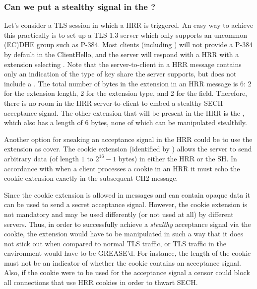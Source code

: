 \subsubsection{Can we put a stealthy signal in the ?}

Let's consider a \ac{TLS} session in which a \ac{HRR} is triggered.
An easy way to achieve this practically is to set up a TLS 1.3 server which only supports an uncommon (\ac{EC})\ac{DHE} group such as P-384.
Most clients (including ) will not provide a P-384  by default in the ClientHello,
and the server will respond with a \ac{HRR} with a  extension selecting .
Note that the server-to-client 
in a \ac{HRR} message contains only an indication of the type of key share the server supports,
but does not include a .
The total number of bytes in the  extension in an \ac{HRR} message is 6: 2 for the extension length, 2 for the extension type, and 2 for the  field. Therefore, there is no room in the HRR server-to-client  to embed a stealthy \ac{SECH} acceptance signal.
The other extension that will be present in the \ac{HRR} is the , which also has a length of 6 bytes, none of which can be manipulated stealthily.

Another option for sneaking an acceptance signal in the \ac{HRR}
could be to use the  extension as cover.
The cookie extension (identified by )
allows the server to send arbitrary data
(of length $1$ to $2^{16}-1$ bytes) in either the \ac{HRR} or the \ac{SH}.
In accordance with \cite{rfc8446} when a client processes a cookie in an \ac{HRR}
it must echo the cookie extension exactly in the subsequent \ac{CH2} message.

Since the cookie extension is allowed in  messages and can contain opaque data it can be used to send a secret acceptance signal.
However, the cookie extension is not mandatory and may be used differently
(or not used at all) by different servers.
Thus, in order to successfully achieve a {\em stealthy} acceptance signal via the cookie, the extension would have to be manipulated in such a way that it does not stick out  when compared to normal \ac{TLS} traffic,
or \ac{TLS} traffic in the environment would have to be \ac{GREASE}'d.
For instance, the length of the cookie must not be an indicator of whether the cookie contains an acceptance signal.
Also, if the cookie were to be used for the acceptance signal a censor could block all connections that use \ac{HRR} cookies in order to thwart \ac{SECH}.

